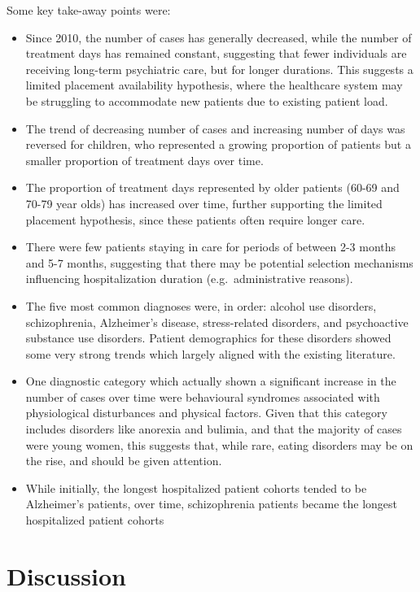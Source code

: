 \documentclass[
  openany]{book}
\providecommand{\tightlist}{%
  \setlength{\itemsep}{0pt}\setlength{\parskip}{0pt}}
\theoremstyle{definition}
\theoremstyle{definition}
\theoremstyle{definition}
\theoremstyle{definition}
\theoremstyle{remark}
\begin{document}
Some key take-away points were:

\begin{itemize}
\tightlist
\item
  Since 2010, the number of cases has generally decreased, while the number of treatment days has remained constant, suggesting that fewer individuals are receiving long-term psychiatric care, but for longer durations. This suggests a limited placement availability hypothesis, where the healthcare system may be struggling to accommodate new patients due to existing patient load.
\item
  The trend of decreasing number of cases and increasing number of days was reversed for children, who represented a growing proportion of patients but a smaller proportion of treatment days over time.
\item
  The proportion of treatment days represented by older patients (60-69 and 70-79 year olds) has increased over time, further supporting the limited placement hypothesis, since these patients often require longer care.
\item
  There were few patients staying in care for periods of between 2-3 months and 5-7 months, suggesting that there may be potential selection mechanisms influencing hospitalization duration (e.g.~administrative reasons).
\item
  The five most common diagnoses were, in order: alcohol use disorders, schizophrenia, Alzheimer's disease, stress-related disorders, and psychoactive substance use disorders. Patient demographics for these disorders showed some very strong trends which largely aligned with the existing literature.
\item
  One diagnostic category which actually shown a significant increase in the number of cases over time were behavioural syndromes associated with physiological disturbances and physical factors. Given that this category includes disorders like anorexia and bulimia, and that the majority of cases were young women, this suggests that, while rare, eating disorders may be on the rise, and should be given attention.
\item
  While initially, the longest hospitalized patient cohorts tended to be Alzheimer's patients, over time, schizophrenia patients became the longest hospitalized patient cohorts
\end{itemize}

\chapter{Discussion}\label{discussion}
\end{document}
